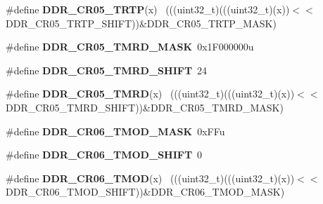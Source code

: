 \begin{DoxyCompactItemize}
\item 
\hypertarget{group___d_d_r___register___masks_ga7104326f930d2d0bc9e7caa0bb0a4897}{}\#define {\bfseries D\+D\+R\+\_\+\+C\+R05\+\_\+\+T\+R\+T\+P}(x)                                              ~(((uint32\+\_\+t)(((uint32\+\_\+t)(x))$<$$<$D\+D\+R\+\_\+\+C\+R05\+\_\+\+T\+R\+T\+P\+\_\+\+S\+H\+I\+F\+T))\&D\+D\+R\+\_\+\+C\+R05\+\_\+\+T\+R\+T\+P\+\_\+\+M\+A\+S\+K)\label{group___d_d_r___register___masks_ga7104326f930d2d0bc9e7caa0bb0a4897}

\item 
\hypertarget{group___d_d_r___register___masks_gab78d1e3d0b585efb024b9e5e1846c861}{}\#define {\bfseries D\+D\+R\+\_\+\+C\+R05\+\_\+\+T\+M\+R\+D\+\_\+\+M\+A\+S\+K}~0x1\+F000000u\label{group___d_d_r___register___masks_gab78d1e3d0b585efb024b9e5e1846c861}

\item 
\hypertarget{group___d_d_r___register___masks_ga642fee30cde8df2b20ab53e0bfead61f}{}\#define {\bfseries D\+D\+R\+\_\+\+C\+R05\+\_\+\+T\+M\+R\+D\+\_\+\+S\+H\+I\+F\+T}~24\label{group___d_d_r___register___masks_ga642fee30cde8df2b20ab53e0bfead61f}

\item 
\hypertarget{group___d_d_r___register___masks_gac2d9723c4b383e455f1e4eace77f558b}{}\#define {\bfseries D\+D\+R\+\_\+\+C\+R05\+\_\+\+T\+M\+R\+D}(x)                                              ~(((uint32\+\_\+t)(((uint32\+\_\+t)(x))$<$$<$D\+D\+R\+\_\+\+C\+R05\+\_\+\+T\+M\+R\+D\+\_\+\+S\+H\+I\+F\+T))\&D\+D\+R\+\_\+\+C\+R05\+\_\+\+T\+M\+R\+D\+\_\+\+M\+A\+S\+K)\label{group___d_d_r___register___masks_gac2d9723c4b383e455f1e4eace77f558b}

\item 
\hypertarget{group___d_d_r___register___masks_ga46e47f82f8e8224600cd30a20640e843}{}\#define {\bfseries D\+D\+R\+\_\+\+C\+R06\+\_\+\+T\+M\+O\+D\+\_\+\+M\+A\+S\+K}~0x\+F\+Fu\label{group___d_d_r___register___masks_ga46e47f82f8e8224600cd30a20640e843}

\item 
\hypertarget{group___d_d_r___register___masks_ga306ca228aee24cd91a358701f37fb045}{}\#define {\bfseries D\+D\+R\+\_\+\+C\+R06\+\_\+\+T\+M\+O\+D\+\_\+\+S\+H\+I\+F\+T}~0\label{group___d_d_r___register___masks_ga306ca228aee24cd91a358701f37fb045}

\item 
\hypertarget{group___d_d_r___register___masks_ga530d608b17b00ba90022c33148ee4bfb}{}\#define {\bfseries D\+D\+R\+\_\+\+C\+R06\+\_\+\+T\+M\+O\+D}(x)                                              ~(((uint32\+\_\+t)(((uint32\+\_\+t)(x))$<$$<$D\+D\+R\+\_\+\+C\+R06\+\_\+\+T\+M\+O\+D\+\_\+\+S\+H\+I\+F\+T))\&D\+D\+R\+\_\+\+C\+R06\+\_\+\+T\+M\+O\+D\+\_\+\+M\+A\+S\+K)\label{group___d_d_r___register___masks_ga530d608b17b00ba90022c33148ee4bfb}


\end{DoxyCompactItemize}

